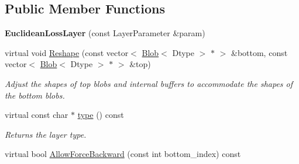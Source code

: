 \subsection*{Public Member Functions}
\begin{DoxyCompactItemize}
\item 
{\bfseries Euclidean\+Loss\+Layer} (const Layer\+Parameter \&param)\hypertarget{classcaffe_1_1EuclideanLossLayer_aea3a6d5454ee1a0db7cdb6c59bcfc5c8}{}\label{classcaffe_1_1EuclideanLossLayer_aea3a6d5454ee1a0db7cdb6c59bcfc5c8}

\item 
virtual void \hyperlink{classcaffe_1_1EuclideanLossLayer_a4d2df2fad6e3d04ed24df9fe6460c683}{Reshape} (const vector$<$ \hyperlink{classcaffe_1_1Blob}{Blob}$<$ Dtype $>$ $\ast$ $>$ \&bottom, const vector$<$ \hyperlink{classcaffe_1_1Blob}{Blob}$<$ Dtype $>$ $\ast$ $>$ \&top)
\begin{DoxyCompactList}\small\item\em Adjust the shapes of top blobs and internal buffers to accommodate the shapes of the bottom blobs. \end{DoxyCompactList}\item 
virtual const char $\ast$ \hyperlink{classcaffe_1_1EuclideanLossLayer_af7c7836f04594b7564b2d740ccaed559}{type} () const \hypertarget{classcaffe_1_1EuclideanLossLayer_af7c7836f04594b7564b2d740ccaed559}{}\label{classcaffe_1_1EuclideanLossLayer_af7c7836f04594b7564b2d740ccaed559}

\begin{DoxyCompactList}\small\item\em Returns the layer type. \end{DoxyCompactList}\item 
virtual bool \hyperlink{classcaffe_1_1EuclideanLossLayer_a3c954fd7c15596fd2f59e0f79601905c}{Allow\+Force\+Backward} (const int bottom\+\_\+index) const 
\end{DoxyCompactItemize}
